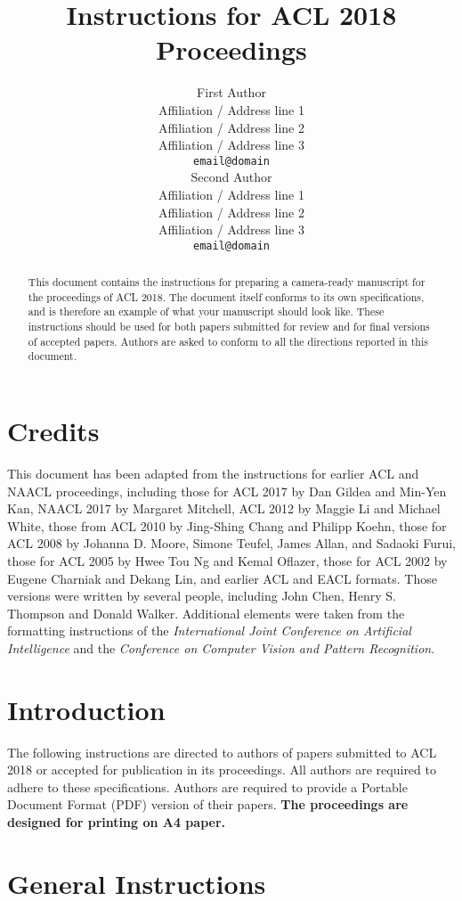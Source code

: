 \documentclass[11pt,a4paper]{article}
\title{Instructions for ACL 2018 Proceedings}
\author{First Author \\
  Affiliation / Address line 1 \\
  Affiliation / Address line 2 \\
  Affiliation / Address line 3 \\
  {\tt email@domain} \\\And
  Second Author \\
  Affiliation / Address line 1 \\
  Affiliation / Address line 2 \\
  Affiliation / Address line 3 \\
  {\tt email@domain} \\}
\date{}
\begin{document}
\maketitle
\begin{abstract}
  This document contains the instructions for preparing a camera-ready
  manuscript for the proceedings of ACL 2018. The document itself
  conforms to its own specifications, and is therefore an example of
  what your manuscript should look like. These instructions should be
  used for both papers submitted for review and for final versions of
  accepted papers.  Authors are asked to conform to all the directions
  reported in this document.
\end{abstract}

\section{Credits}

This document has been adapted from the instructions for earlier ACL
and NAACL proceedings, including those for ACL 2017 by Dan Gildea and
Min-Yen Kan, NAACL 2017 by Margaret Mitchell, ACL 2012 by Maggie Li
and Michael White, those from ACL 2010 by Jing-Shing Chang and Philipp
Koehn, those for ACL 2008 by Johanna D. Moore, Simone Teufel, James
Allan, and Sadaoki Furui, those for ACL 2005 by Hwee Tou Ng and Kemal
Oflazer, those for ACL 2002 by Eugene Charniak and Dekang Lin, and
earlier ACL and EACL formats. Those versions were written by several
people, including John Chen, Henry S. Thompson and Donald
Walker. Additional elements were taken from the formatting
instructions of the {\em International Joint Conference on Artificial
  Intelligence} and the \emph{Conference on Computer Vision and
  Pattern Recognition}.

\section{Introduction}

The following instructions are directed to authors of papers submitted
to ACL 2018 or accepted for publication in its proceedings. All
authors are required to adhere to these specifications. Authors are
required to provide a Portable Document Format (PDF) version of their
papers. \textbf{The proceedings are designed for printing on A4
paper.}

\section{General Instructions}
\end{document}
